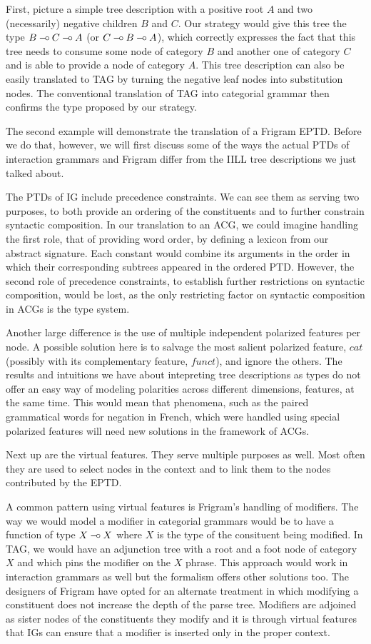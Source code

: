 First, picture a simple tree description with a positive root $A$ and
two (necessarily) negative children $B$ and $C$. Our strategy would give
this tree the type $B \mathbin{{-}\mkern-3.5mu{\circ}} C \mathbin{{-}\mkern-3.5mu{\circ}} A$ (or $C \mathbin{{-}\mkern-3.5mu{\circ}} B \mathbin{{-}\mkern-3.5mu{\circ}} A$), which
correctly expresses the fact that this tree needs to consume some node
of category $B$ and another one of category $C$ and is able to provide a
node of category $A$. This tree description can also be easily
translated to TAG by turning the negative leaf nodes into substitution
nodes. The conventional translation of TAG into categorial grammar then
confirms the type proposed by our strategy.

The second example will demonstrate the translation of a Frigram
EPTD. Before we do that, however, we will first discuss some of the ways
the actual PTDs of interaction grammars and Frigram differ from the IILL
tree descriptions we just talked about.

The PTDs of IG include precedence constraints. We can see them as
serving two purposes, to both provide an ordering of the constituents
and to further constrain syntactic composition. In our translation to an
ACG, we could imagine handling the first role, that of providing word
order, by defining a lexicon from our abstract signature. Each constant
would combine its arguments in the order in which their corresponding
subtrees appeared in the ordered PTD. However, the second role of
precedence constraints, to establish further restrictions on syntactic
composition, would be lost, as the only restricting factor on syntactic
composition in ACGs is the type system.

Another large difference is the use of multiple independent polarized
features per node. A possible solution here is to salvage the most
salient polarized feature, $cat$ (possibly with its complementary
feature, $funct$), and ignore the others. The results and intuitions we
have about intepreting tree descriptions as types do not offer an easy
way of modeling polarities across different dimensions, features, at the
same time. This would mean that phenomena, such as the paired
grammatical words for negation in French, which were handled using
special polarized features will need new solutions in the framework of
ACGs.

Next up are the virtual features. They serve multiple purposes as
well. Most often they are used to select nodes in the context and to
link them to the nodes contributed by the EPTD.

A common pattern using virtual features is Frigram's handling of
modifiers. The way we would model a modifier in categorial grammars
would be to have a function of type $X \mathbin{{-}\mkern-3.5mu{\circ}} X$ where $X$ is the type of
the consituent being modified. In TAG, we would have an adjunction tree
with a root and a foot node of category $X$ and which pins the modifier
on the $X$ phrase. This approach would work in interaction grammars as
well but the formalism offers other solutions too. The designers of
Frigram have opted for an alternate treatment in which modifying a
constituent does not increase the depth of the parse tree. Modifiers are
adjoined as sister nodes of the constituents they modify and it is
through virtual features that IGs can ensure that a modifier is inserted
only in the proper context.

